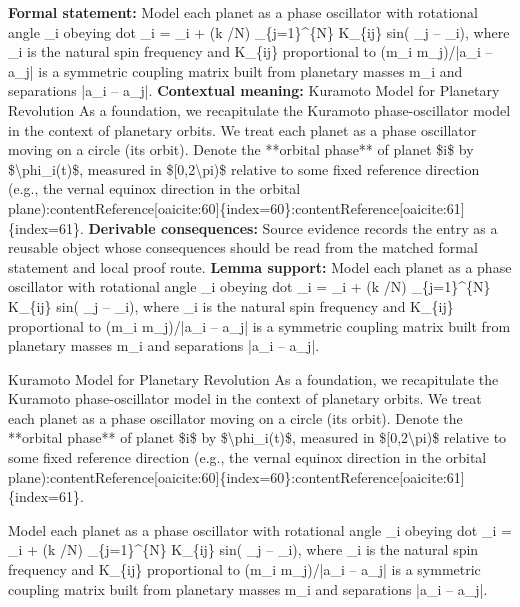 \begingroup\footnotesize\setlength{\emergencystretch}{3em}\sloppy
\textbf{Formal statement:} Model each planet as a phase oscillator with rotational angle  \_i obeying dot  \_i =  \_i + (k /N)    \_\{j=1\}\textasciicircum{}\{N\} K\_\{ij\} sin( \_j --  \_i), where  \_i is the natural spin frequency and K\_\{ij\} proportional to (m\_i m\_j)/|a\_i -- a\_j|  is a symmetric coupling matrix built from planetary masses m\_i and separations |a\_i -- a\_j|.
\textbf{Contextual meaning:} Kuramoto Model for Planetary Revolution As a foundation, we recapitulate the Kuramoto phase-oscillator model in the context of planetary orbits. We treat each planet as a phase oscillator moving on a circle (its orbit). Denote the **orbital phase** of planet \$i\$ by \$\textbackslash{}phi\_i(t)\$, measured in \$[0,2\textbackslash{}pi)\$ relative to some fixed reference direction (e.g., the vernal equinox direction in the orbital plane):contentReference[oaicite:60]\{index=60\}:contentReference[oaicite:61] \{index=61\}.
\textbf{Derivable consequences:} Source evidence records the entry as a reusable object whose consequences should be read from the matched formal statement and local proof route.
\textbf{Lemma support:} Model each planet as a phase oscillator with rotational angle  \_i obeying dot  \_i =  \_i + (k /N)    \_\{j=1\}\textasciicircum{}\{N\} K\_\{ij\} sin( \_j --  \_i), where  \_i is the natural spin frequency and K\_\{ij\} proportional to (m\_i m\_j)/|a\_i -- a\_j|  is a symmetric coupling matrix built from planetary masses m\_i and separations |a\_i -- a\_j|.\par
\endgroup

Kuramoto Model for Planetary Revolution As a foundation, we recapitulate the Kuramoto phase-oscillator model in the context of planetary orbits. We treat each planet as a phase oscillator moving on a circle (its orbit). Denote the **orbital phase** of planet \$i\$ by \$\textbackslash{}phi\_i(t)\$, measured in \$[0,2\textbackslash{}pi)\$ relative to some fixed reference direction (e.g., the vernal equinox direction in the orbital plane):contentReference[oaicite:60]\{index=60\}:contentReference[oaicite:61] \{index=61\}.

Model each planet as a phase oscillator with rotational angle  \_i obeying dot  \_i =  \_i + (k /N)    \_\{j=1\}\textasciicircum{}\{N\} K\_\{ij\} sin( \_j --  \_i), where  \_i is the natural spin frequency and K\_\{ij\} proportional to (m\_i m\_j)/|a\_i -- a\_j|  is a symmetric coupling matrix built from planetary masses m\_i and separations |a\_i -- a\_j|.

